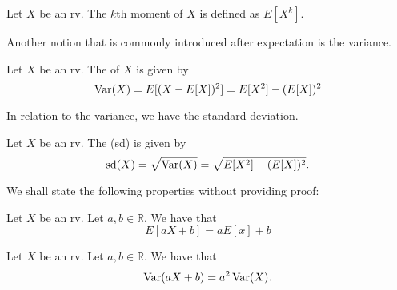 \documentclass[notoc,notitlepage]{tufte-book}
\begin{document}
\begin{defn}[Moment]
\label{defn:moment}
  Let $X$ be an rv. The $k$th moment of $X$ is defined as $E[ X^k ]$.
\end{defn}

Another notion that is commonly introduced after expectation is the variance.

\begin{defn}[Variance]
\label{defn:variance}
  Let $X$ be an rv. The  of $X$ is given by
  \begin{equation*}
    \operatorname{Var}(X) = E[ (X - E[X])^2 ] = E[ X^2 ] - ( E[X] )^2
  \end{equation*}
\end{defn}

In relation to the variance, we have the standard deviation.

\begin{defn}
\label{defn:standard_deviation}
  Let $X$ be an rv. The  (sd) is given by
  \begin{equation*}
    \operatorname{sd}(X) = \sqrt{\operatorname{Var}(X)} = \sqrt{ E[X^2] - (E[X])^2 }.
  \end{equation*}
\end{defn}

We shall state the following properties without providing proof:

\begin{propo}
\label{propo:linearity_of_the_expectation}
  Let $X$ be an rv. Let $a, b \in \mathbb{R}$. We have that
  \begin{equation*}
    E[ aX + b ] = aE[x] + b
  \end{equation*}
\end{propo}

\begin{propo}
\label{propo:linearity_of_the_variance}
  Let $X$ be an rv. Let $a, b \in \mathbb{R}$. We have that
  \begin{equation*}
    \operatorname{Var}(aX + b) = a^2 \operatorname{Var}(X).
  \end{equation*}
\end{propo}
\end{document}
